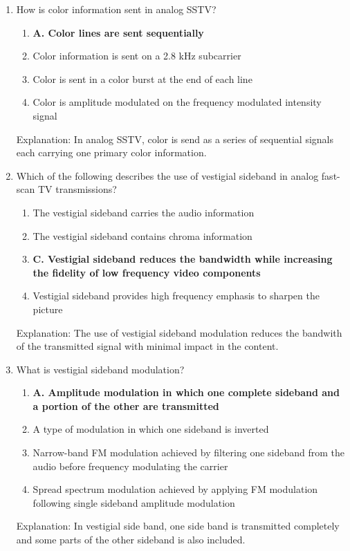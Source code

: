 \begin{enumerate}
    \item How is color information sent in analog SSTV?
       \begin{enumerate}
        \item \textbf{A. Color lines are sent sequentially}
         \item  Color information is sent on a 2.8 kHz subcarrier
          \item  Color is sent in a color burst at the end of each line
         \item  Color is amplitude modulated on the frequency modulated intensity signal
        \end{enumerate}
    \textcolor{myred}{Explanation:}
    In analog SSTV, color is send as a series of sequential signals each carrying one primary color information.

       \item Which of the following describes the use of vestigial sideband in analog fast-scan TV transmissions?
    \begin{enumerate}
        \item  The vestigial sideband carries the audio information
      \item  The vestigial sideband contains chroma information
         \item \textbf{C. Vestigial sideband reduces the bandwidth while increasing the fidelity of low frequency video components}
       \item  Vestigial sideband provides high frequency emphasis to sharpen the picture
        \end{enumerate}
    \textcolor{myred}{Explanation:}
    The use of vestigial sideband modulation reduces the bandwith of the transmitted signal with minimal impact in the content.
    
    \item What is vestigial sideband modulation?
      \begin{enumerate}
       \item \textbf{A. Amplitude modulation in which one complete sideband and a portion of the other are transmitted}
         \item  A type of modulation in which one sideband is inverted
      \item  Narrow-band FM modulation achieved by filtering one sideband from the audio before frequency modulating the carrier
        \item  Spread spectrum modulation achieved by applying FM modulation following single sideband amplitude modulation
     \end{enumerate}
        \textcolor{myred}{Explanation:}
       In vestigial side band, one side band is transmitted completely and some parts of the other sideband is also included.


\end{enumerate}
